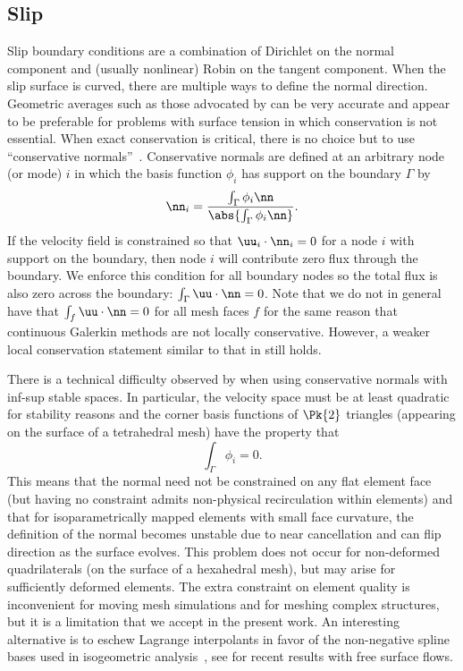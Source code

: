 \subsection{Slip}
Slip boundary conditions are a combination of Dirichlet on the normal component and (usually nonlinear) Robin on the tangent component.
When the slip surface is curved, there are multiple ways to define the normal direction.
Geometric averages such as those advocated by \cite{walkley2004calculation} can be very accurate and appear to be preferable for problems with surface tension in which conservation is not essential.
When exact conservation is critical, there is no choice but to use ``conservative normals''~\cite{lynch1980finite}.
Conservative normals are defined at an arbitrary node (or mode) $i$ in which the basis function $\phi_i$ has support on the boundary $\Gamma$ by
\begin{equation}
  \label{eq:slip:conservative-normal}
  \nn_i = \frac{\int_\Gamma \phi_i \nn}{\abs{\int_\Gamma \phi_i\nn}} .
\end{equation}
If the velocity field is constrained so that $\uu_i \cdot \nn_i = 0$ for a node $i$ with support on the boundary, then node $i$ will contribute zero flux through the boundary.
We enforce this condition for all boundary nodes so the total flux is also zero across the boundary: $\int_\Gamma \uu \cdot \nn = 0$.
Note that we do not in general have that $\int_f \uu \cdot \nn = 0$ for all mesh faces $f$ for the same reason that continuous Galerkin methods are not locally conservative.
However, a weaker local conservation statement similar to that in \cite{hughes2000continuous} still holds.

There is a technical difficulty observed by \cite{walkley2004calculation} when using conservative normals with inf-sup stable spaces.
In particular, the velocity space must be at least quadratic for stability reasons and the corner basis functions of $\Pk{2}$ triangles (appearing on the surface of a tetrahedral mesh) have the property that
\begin{equation*}
  \int_\Gamma \phi_i = 0 .
\end{equation*}
This means that the normal need not be constrained on any flat element face (but having no constraint admits non-physical recirculation within elements) and that for isoparametrically mapped elements with small face curvature, the definition of the normal becomes unstable due to near cancellation and can flip direction as the surface evolves.
This problem does not occur for non-deformed quadrilaterals (on the surface of a hexahedral mesh), but may arise for sufficiently deformed elements.
The extra constraint on element quality is inconvenient for moving mesh simulations and for meshing complex structures, but it is a limitation that we accept in the present work.
An interesting alternative is to eschew Lagrange interpolants in favor of the non-negative spline bases used in isogeometric analysis~\cite{cottrell2009isogeometric}, see \cite{akkerman2011isogeometric} for recent results with free surface flows.

